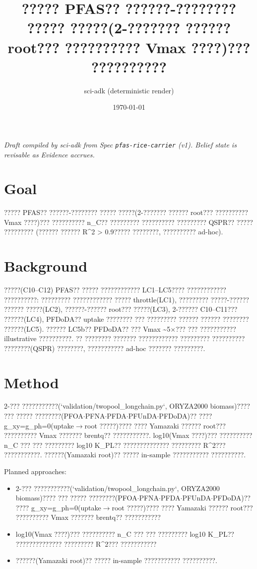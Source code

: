 \documentclass{article}
\title{????? PFAS?? ??????-???????? ????? ?????(2-??????? ?????? root??? ?????????? Vmax ????)??? ??????????}
\author{sci-adk (deterministic render)}
\date{\today}
\begin{document}
\maketitle

\noindent\textit{Draft compiled by sci-adk from Spec \texttt{pfas-rice-carrier} (v1). Belief state is revisable as Evidence accrues.}

\section{Goal}
????? PFAS?? ??????-???????? ????? ?????(2-??????? ?????? root??? ?????????? Vmax ????)??? ??????????
n\_C?? ????????? ?????????? ????????? QSPR?? ????? ????????? (?????? ?????? R\textasciicircum{}2 > 0.9????? ????????,
?????????? ad-hoc).

\section{Background}
?????(C10--C12) PFAS?? ????? ???????????? LC1--LC5???? ???????????? ??????????: ?????????
???????????? ????? throttle(LC1), ????????? ?????-?????? ?????? ?????(LC2), ??????-?????? root???
?????(LC3), 2-?????? C10--C11??? ??????(LC4), PFDoDA?? uptake ???????? ??? ????????? ??????
?????? ???????? ??????(LC5). ?????? LC5b?? PFDoDA?? ??? Vmax \textasciitilde{}5$\times$??? ??? ??????????? illustrative
??????????. ?? ???????? ??????? ???????????? ????????? ?????????? ????????(QSPR) ????????,
??????????? ad-hoc ??????? ?????????.

\section{Method}
2-??? ???????????(`validation/twopool\_longchain.py`, ORYZA2000 biomass)???? ??? ?????
????????(PFOA$\cdot$PFNA$\cdot$PFDA$\cdot$PFUnDA$\cdot$PFDoDA)?? ???? g\_xy=g\_ph=0(uptake$\rightarrow$root ?????)???? ????
Yamazaki ?????? root??? ?????????? Vmax ??????? brentq?? ???????????. log10(Vmax ????)??? ??????????
n\_C ??? ??? ????????? log10 K\_PL?? ?????????????? ????????? R\textasciicircum{}2??? ???????????. ??????(Yamazaki root)??
????? in-sample ??????????? ??????????.

Planned approaches:
\begin{itemize}
  \item 2-??? ???????????(`validation/twopool\_longchain.py`, ORYZA2000 biomass)???? ??? ?????
????????(PFOA$\cdot$PFNA$\cdot$PFDA$\cdot$PFUnDA$\cdot$PFDoDA)?? ???? g\_xy=g\_ph=0(uptake$\rightarrow$root ?????)???? ????
Yamazaki ?????? root??? ?????????? Vmax ??????? brentq?? ???????????
  \item log10(Vmax ????)??? ??????????
n\_C ??? ??? ????????? log10 K\_PL?? ?????????????? ????????? R\textasciicircum{}2??? ???????????
  \item ??????(Yamazaki root)??
????? in-sample ??????????? ??????????.
\end{itemize}
\end{document}
